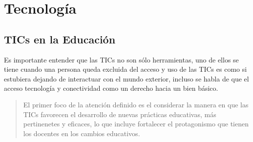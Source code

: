 \chapter{Tecnolog\'{i}a }

\section{TICs en la Educaci\'{o}n}

Es importante entender que las TICs no son s\'{o}lo herramientas, uno de ellos se tiene cuando
una persona queda excluida del acceso y uso de las TICs es como si estubiera dejando de interactuar
con el mundo exterior, incluso se habla de que el acceso tecnolog\'{i}a y conectividad como un 
derecho hacia un bien b\'{a}sico.

\begin{quote}
El primer foco de la atención definido es el considerar la manera en que las TICs favorecen el desarrollo
de nuevas prácticas educativas, más pertinenetes y eficaces, lo que incluye fortalecer el protagonismo 
que tienen los docentes en los cambios educativos.\cite{severin2013enfoques}
\end{quote}